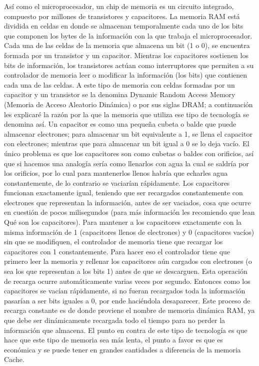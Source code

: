 \documentclass{article}
\begin{document}
Así como el microprocesador, un chip de memoria es un circuito integrado, compuesto por
millones de transistores y capacitores. La memoria RAM está dividida en celdas en donde se
almacenan temporalmente cada uno de los bits que componen los bytes de la información con
la que trabaja el microprocesador. Cada una de las celdas de la memoria que almacena un bit (1
o 0), se encuentra formada por un transistor y un capacitor. Mientras los capacitores sostienen
los bits de información, los transistores actúan como interruptores que permiten a su
controlador de memoria leer o modificar la información (los bits) que contienen cada una de
las celdas. A este tipo de memoria con celdas formadas por un capacitor y un transistor se la
denomina Dynamic Random Access Memory (Memoria de Acceso Aleatorio Dinámica) o por sus
siglas DRAM; a continuación les explicaré la razón por la que la memoria que utiliza ese tipo de
tecnología se denomina así.
Un capacitor es como una pequeña cubeta o balde que puede almacenar electrones; para
almacenar un bit equivalente a 1, se llena el capacitor con electrones; mientras que para
almacenar un bit igual a 0 se lo deja vacío. El único problema es que los capacitores son como
cubetas o baldes con orificios, así que si hacemos una analogía sería como llenarlos con agua la
cual se saldría por los orificios, por lo cual para mantenerlos llenos habría que echarles agua
constantemente, de lo contrario se vaciarían rápidamente. Los capacitores funcionan
exactamente igual, teniendo que ser recargados constantemente con electrones que
representan la información, antes de ser vaciados, cosa que ocurre en cuestión de pocos
milisegundos (para más información les recomiendo que lean Qué son los capacitores). 
Para mantener a los capacitores exactamente con la misma información de 1 (capacitores llenos de
electrones) y 0 (capacitores vacíos) sin que se modifiquen, el controlador de memoria tiene que
recargar los capacitores con 1 constantemente. Para hacer eso el controlador tiene que primero
leer la memoria y rellenar los capacitores aún cargados con electrones (o sea los que
representan a los bits 1) antes de que se descarguen. Esta operación de recarga ocurre
automáticamente varias veces por segundo.
Entonces como los capacitores se vacían rápidamente, si no fueran recargados toda la
información pasarían a ser bits iguales a 0, por ende haciéndola desaparecer. Este proceso de
recarga constante es de donde proviene el nombre de memoria dinámica RAM, ya que debe ser
dinámicamente recargada todo el tiempo para no perder la información que almacena. El punto
en contra de este tipo de tecnología es que hace que este tipo de memoria sea más lenta, el
punto a favor es que es económica y se puede tener en grandes cantidades a diferencia de la
memoria Cache.
\end{document}

